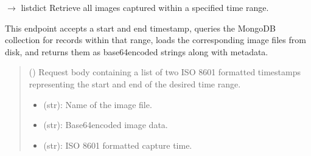 \documentclass[letterpaper,10pt,english]{sphinxmanual}
\begin{document}

\begin{fulllineitems}
\label{\detokenize{modules/src.pig_sorting_api.main:src.pig_sorting_api.main.get_images_by_date}}
\pysigstartsignatures
\pysiglinewithargsret
{}
{}
{{ $\rightarrow$ list\DUrole{p}{{[}}dict\DUrole{p}{{]}}}}
\pysigstopsignatures
\sphinxAtStartPar
Retrieve all images captured within a specified time range.

\sphinxAtStartPar
This endpoint accepts a start and end timestamp, queries the
 MongoDB collection for records within that range,
loads the corresponding image files from disk, and returns them
as base64\sphinxhyphen{}encoded strings along with metadata.
\begin{quote}\begin{description}
\sphinxAtStartPar
{} ({\hyperref[\detokenize{modules/src.pig_sorting_api.main:src.pig_sorting_api.main.TimesRequest}]{}}) \textendash{} Request body containing a list of two
ISO 8601 formatted timestamps representing the start and
end of the desired time range.

\sphinxAtStartPar
\begin{description}
\begin{itemize}
\item {} 
\sphinxAtStartPar
{} (str): Name of the image file.

\item {} 
\sphinxAtStartPar
{} (str): Base64\sphinxhyphen{}encoded image data.

\item {} 
\sphinxAtStartPar
{} (str): ISO 8601 formatted capture time.


\end{itemize}
\end{description}
\end{description}
\end{quote}
\end{fulllineitems}
\end{document}
